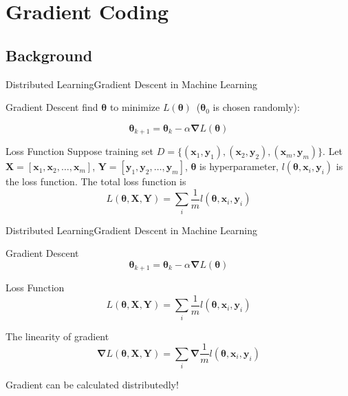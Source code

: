 \documentclass{beamer}
\begin{document}
\section{Gradient Coding}

\subsection{Background}

\begin{frame}{Distributed Learning}{Gradient Descent in Machine Learning}

\begin{block}{Gradient Descent}
    find $\boldsymbol{\theta}$ to minimize $L(\boldsymbol{\theta})$\ ($\boldsymbol{\theta}_0$ is chosen randomly):

    \[\boldsymbol{\theta}_{k + 1} = \boldsymbol{\theta}_{k} - \alpha\boldsymbol{\nabla} L(\boldsymbol{\theta})\]
\end{block}

\begin{block}{Loss Function}
    Suppose training set $D = \{(\boldsymbol{x}_1, \boldsymbol{y}_1), (\boldsymbol{x}_2, \boldsymbol{y}_2), (\boldsymbol{x}_m, \boldsymbol{y}_m)\}$. Let $\boldsymbol{X} = [\boldsymbol{x}_1, \boldsymbol{x}_2, \dots, \boldsymbol{x}_m]$, $\boldsymbol{Y} = [\boldsymbol{y}_1, \boldsymbol{y}_2, \dots, \boldsymbol{y}_m]$, $\boldsymbol{\theta}$ is hyperparameter, $l(\boldsymbol{\theta}, \boldsymbol{x}_i, \boldsymbol{y}_i)$ is the loss function. The total loss function is
    \[L(\boldsymbol{\theta}, \boldsymbol{X}, \boldsymbol{Y}) = \sum_{i}\frac{1}{m}l(\boldsymbol{\theta}, \boldsymbol{x}_i, \boldsymbol{y}_i)\]
\end{block}

\end{frame}

\begin{frame}{Distributed Learning}{Gradient Descent in Machine Learning}

\begin{block}{Gradient Descent}
    \[\boldsymbol{\theta}_{k + 1} = \boldsymbol{\theta}_{k} - \alpha\boldsymbol{\nabla} L(\boldsymbol{\theta})\]
\end{block}

\begin{block}{Loss Function}
    \[L(\boldsymbol{\theta}, \boldsymbol{X}, \boldsymbol{Y}) = \sum_{i}\frac{1}{m}l(\boldsymbol{\theta}, \boldsymbol{x}_i, \boldsymbol{y}_i)\]
\end{block}

\begin{block}{The linearity of gradient}
    \[\boldsymbol{\nabla} L(\boldsymbol{\theta}, \boldsymbol{X}, \boldsymbol{Y}) = \sum_{i}\boldsymbol{\nabla} \frac{1}{m}l(\boldsymbol{\theta}, \boldsymbol{x}_i, \boldsymbol{y}_i)\]
\end{block}

Gradient can be calculated distributedly!

\end{frame}
\end{document}
